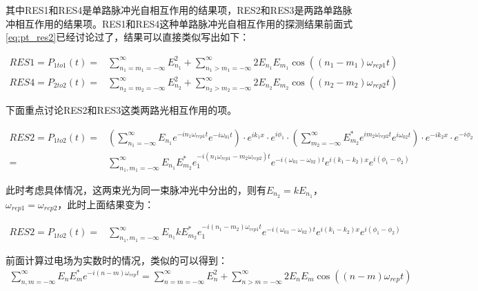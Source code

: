 其中RES1和RES4是单路脉冲光自相互作用的结果项，RES2和RES3是两路单路脉冲相互作用的结果项。RES1和RES4这种单路脉冲光自相互作用的探测结果前面式\eqref{eq:pt_res2}已经讨论过了，结果可以直接类似写出如下：

\begin{align}
    RES1=P_{1to1}(t)=&\sum_{n_1=m_1=-\infty}^{\infty}E_{n_1}^2 + \sum_{n_1>m_1=-\infty}^{\infty}2E_{n_1} E_{m_1} \cos\left((n_1-m_1)\omega_{rep1}t\right)\label{eq:final_res1}\\
    RES4=P_{2to2}(t)=&\sum_{n_2=m_2=-\infty}^{\infty}E_{n_2}^2 + \sum_{n_2>m_2=-\infty}^{\infty}2E_{n_2} E_{m_2} \cos\left((n_2-m_2)\omega_{rep2}t\right)\label{eq:final_res4}
\end{align}


下面重点讨论RES2和RES3这类两路光相互作用的项。
\begin{footnotesize}
\begin{align}
    RES2=P_{1to2}(t)=&\left(\sum_{n_1=-\infty}^{\infty}E_{n_1}e^{-in_1\omega_{rep1}t}e^{-i\omega_{01}t}\right)\cdot e^{ik_1x}\cdot e^{i\phi_1} 
    \cdot \left(\sum_{m_2=-\infty}^{\infty}E_{m_2}^*e^{im_2\omega_{rep2}t}e^{i\omega_{02}t}\right)\cdot e^{-ik_2x}\cdot e^{-i\phi_2}\\
    =&\sum_{n_1,m_1=-\infty}^{\infty}E_{n_1}E_{m_2}^*e_1^{-i(n_1\omega_{rep1}-m_2\omega_{rep2})t}e^{-i(\omega_{01}-\omega_{02})t}e^{i(k_1-k_2)x}e^{i(\phi_1-\phi_2)}
\end{align}
\end{footnotesize}

此时考虑具体情况，这两束光为同一束脉冲光中分出的，则有$E_{n_2}=kE_{n_1}$，$\omega_{rep1}=\omega_{rep2}$，此时上面结果变为：
\begin{footnotesize}
\begin{align}
    RES2=P_{1to2}(t)=&\sum_{n_1,m_1=-\infty}^{\infty}E_{n_1}kE_{m_2}^*e_1^{-i(n_1-m_2)\omega_{rep1}t}e^{-i(\omega_{01}-\omega_{02})t}e^{i(k_1-k_2)x}e^{i(\phi_1-\phi_2)}
\end{align}
\end{footnotesize}

前面计算过电场为实数时的情况，类似的可以得到：
\begin{align}
    \sum_{n,m=-\infty}^{\infty}E_nE_m^*e^{-i(n-m)\omega_{rep}t}=\sum_{n=m=-\infty}^{\infty}E_n^2+\sum_{n>m=-\infty}^{\infty}2E_nE_m\cos((n-m)\omega_{rep}t)
\end{align}

